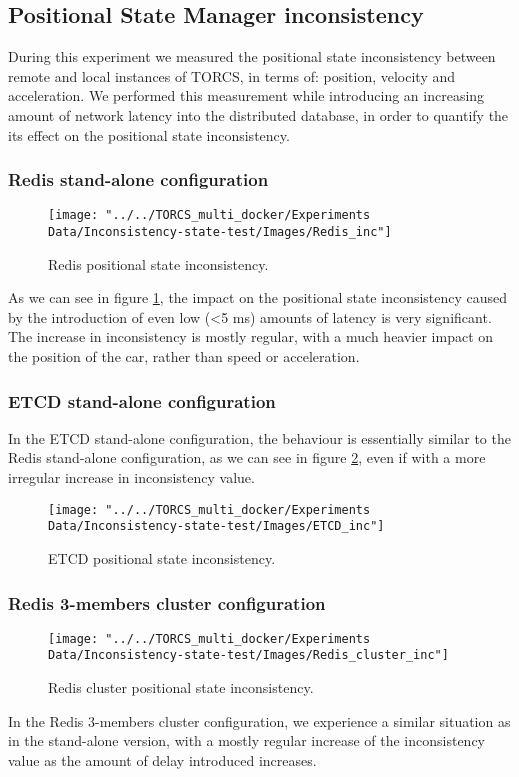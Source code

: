 \subsection{Positional State Manager inconsistency}
During this experiment we measured the positional state inconsistency between remote and local instances of TORCS, in terms of: position, velocity and acceleration. We performed this measurement while introducing an increasing amount of network latency into the distributed database, in order to quantify the its effect on the positional state inconsistency. 
\subsubsection{Redis stand-alone configuration}
\begin{figure}[h!]
	\centering
	\texttt{[image: "../../TORCS\_multi\_docker/Experiments Data/Inconsistency-state-test/Images/Redis\_inc"]}
	\caption[Redis positional state inconsistency]{Redis positional state inconsistency.}
	\label{fig:redis-inconsistency}
\end{figure}
As we can see in figure \ref{fig:redis-inconsistency}, the impact on the positional state inconsistency caused by the introduction of even low (<5 ms) amounts of latency is very significant. The increase in inconsistency is mostly regular, with a much heavier impact on the position of the car, rather than speed or acceleration.

\subsubsection{ETCD stand-alone configuration}
In the ETCD stand-alone configuration, the behaviour is essentially similar to the Redis stand-alone configuration, as we can see in figure \ref{fig:etcd-inconsistency}, even if with a more irregular increase in inconsistency value.
\begin{figure}[h!]
	\centering
	\texttt{[image: "../../TORCS\_multi\_docker/Experiments Data/Inconsistency-state-test/Images/ETCD\_inc"]}
	\caption[ETCD positional state inconsistency]{ETCD positional state inconsistency.}
	\label{fig:etcd-inconsistency}
\end{figure}

\subsubsection{Redis 3-members cluster configuration}
\begin{figure}[h!]
	\centering
	\texttt{[image: "../../TORCS\_multi\_docker/Experiments Data/Inconsistency-state-test/Images/Redis\_cluster\_inc"]}
	\caption[Redis cluster positional state inconsistency]{Redis cluster positional state inconsistency.}
	\label{fig:redis-cluster-inconsistency}
\end{figure}
In the Redis 3-members cluster configuration, we experience a similar situation as in the stand-alone version, with a mostly regular increase of the inconsistency value as the amount of delay introduced increases.

